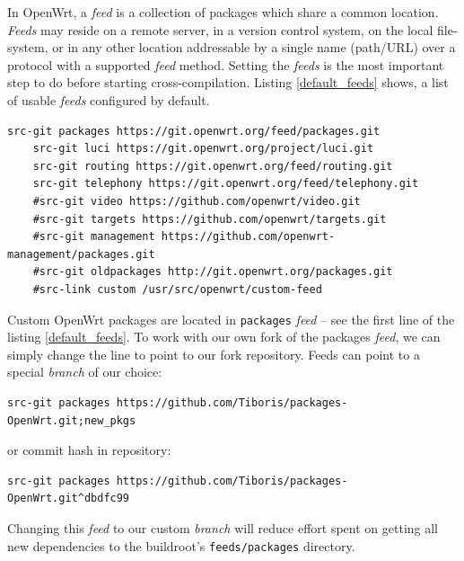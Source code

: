 In OpenWrt, a {\it feed} is a collection of packages which share a common location.
{\it Feeds} may reside on a remote server, in a version control system, on the local file-system, or in any other location addressable by a single name (path/URL) over a protocol with a supported {\it feed} method.
Setting the {\it feeds} is the most important step to do before starting cross-compilation.
Listing \ref{default_feeds} shows, a list of usable {\it feeds} configured by default.\newpage
\begin{lstlisting}[columns=fixed,basicstyle=\ttfamily\footnotesize,tabsize=4,label=default_feeds,caption=Content of feeds.conf.default]
    src-git packages https://git.openwrt.org/feed/packages.git
    src-git luci https://git.openwrt.org/project/luci.git
    src-git routing https://git.openwrt.org/feed/routing.git
    src-git telephony https://git.openwrt.org/feed/telephony.git
    #src-git video https://github.com/openwrt/video.git
    #src-git targets https://github.com/openwrt/targets.git
    #src-git management https://github.com/openwrt-management/packages.git
    #src-git oldpackages http://git.openwrt.org/packages.git
    #src-link custom /usr/src/openwrt/custom-feed
\end{lstlisting}
Custom OpenWrt packages are located in {\tt packages} {\it feed} -- see the first line of the listing \ref{default_feeds}.
To work with our own fork of the packages {\it feed}, we can simply change the line to point to our fork repository.
Feeds can point to a special {\it branch} of our choice:
\begin{lstlisting}[columns=fixed,basicstyle=\ttfamily\footnotesize,tabsize=4,backgroundcolor=\color{yellow!10}]
src-git packages https://github.com/Tiboris/packages-OpenWrt.git;new_pkgs
\end{lstlisting}
or commit hash in repository:
\begin{lstlisting}[columns=fixed,basicstyle=\ttfamily\footnotesize,tabsize=4,backgroundcolor=\color{yellow!10}]
src-git packages https://github.com/Tiboris/packages-OpenWrt.git^dbdfc99
\end{lstlisting}
Changing this {\it feed} to our custom {\it branch} will reduce effort spent on getting all new dependencies to the buildroot's {\tt feeds/packages} directory.

